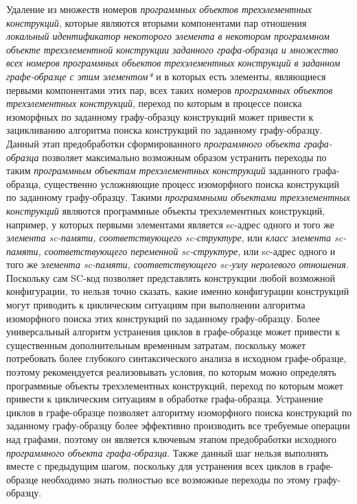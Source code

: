 \begin{SCn}
\begin{scnsubstruct}
\begin{scnsubstruct}
\begin{scnsubstruct}
\begin{scnsubstruct}
\begin{scnsubstruct}
\begin{scnsubstruct}
\begin{scnsubstruct}
\begin{scnsubstruct}
{\begin{scnitemize}
				\item Удаление из множеств номеров \textit{программных объектов трехэлементных конструкций}, которые являются вторыми компонентами пар отношения \textit{локальный идентификатор некоторого элемента в некотором программном объекте трехэлементной конструкции заданного графа-образца и множество всех номеров программных объектов трехэлементных конструкций в заданном графе-образце с этим элементом*} и в которых есть элементы, являющиеся первыми компонентами этих пар, всех таких номеров \textit{программных объектов трехэлементных конструкций}, переход по которым в процессе поиска изоморфных по заданному графу-образцу конструкций может привести к зацикливанию алгоритма поиска конструкций по заданному графу-образцу. Данный этап предобработки сформированного \textit{программного объекта графа-образца} позволяет максимально возможным образом устранить переходы по таким \textit{программным объектам трехэлементных конструкций} заданного графа-образца, существенно усложняющие процесс изоморфного поиска конструкций по заданному графу-образцу. Такими \textit{программными объектами трехэлементных конструкций} являются программные объекты трехэлементных конструкций, например, у которых первыми элементами является sc-адрес одного и того же \textit{элемента sc-памяти, соответствующего sc-структуре}, или \textit{класс элемента sc-памяти\scnsupergroupsign, соответствующего переменной sc-структуре}, или sc-адрес одного и того же \textit{элемента sc-памяти, соответствующего sc-узлу неролевого отношения}. Поскольку сам SC-код позволяет представлять конструкции любой возможной конфигурации, то нельзя точно сказать, какие именно конфигурации конструкций могут приводить к циклическим ситуациям при выполнении алгоритма изоморфного поиска этих конструкций по заданному графу-образцу. Более универсальный алгоритм устранения циклов в графе-образце может привести к существенным дополнительным временным затратам, поскольку может потребовать более глубокого синтаксического анализа в исходном графе-образце, поэтому рекомендуется реализовывать условия, по которым можно определять программные объекты трехэлементных конструкций, переход по которым может привести к циклическим ситуациям в обработке графа-образца. Устранение циклов в графе-образце позволяет алгоритму изоморфного поиска конструкций по заданному графу-образцу более эффективно производить все требуемые операции над графами, поэтому он является ключевым этапом предобработки исходного \textit{программного объекта графа-образца}. Также данный шаг нельзя выполнять вместе с предыдущим шагом, поскольку для устранения всех циклов в графе-образце необходимо знать полностью все возможные переходы по этому графу-образцу.

\end{scnitemize}}
\end{scnsubstruct}
\end{scnsubstruct}
\end{scnsubstruct}
\end{scnsubstruct}
\end{scnsubstruct}
\end{scnsubstruct}
\end{scnsubstruct}
\end{scnsubstruct}
\end{SCn}
